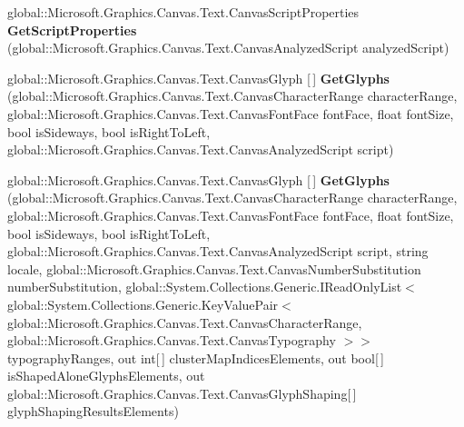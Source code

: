\begin{DoxyCompactItemize}
\mbox{\label{interface_microsoft_1_1_graphics_1_1_canvas_1_1_text_1_1_i_canvas_text_analyzer_a689cfaece7845a1ac47afa71449b2076}} 
global\+::\+Microsoft.\+Graphics.\+Canvas.\+Text.\+Canvas\+Script\+Properties {\bfseries Get\+Script\+Properties} (global\+::\+Microsoft.\+Graphics.\+Canvas.\+Text.\+Canvas\+Analyzed\+Script analyzed\+Script)
\item 
\mbox{\label{interface_microsoft_1_1_graphics_1_1_canvas_1_1_text_1_1_i_canvas_text_analyzer_ae275ea97283c83f61364e0b52c92e782}} 
global\+::\+Microsoft.\+Graphics.\+Canvas.\+Text.\+Canvas\+Glyph \mbox{[}$\,$\mbox{]} {\bfseries Get\+Glyphs} (global\+::\+Microsoft.\+Graphics.\+Canvas.\+Text.\+Canvas\+Character\+Range character\+Range, global\+::\+Microsoft.\+Graphics.\+Canvas.\+Text.\+Canvas\+Font\+Face font\+Face, float font\+Size, bool is\+Sideways, bool is\+Right\+To\+Left, global\+::\+Microsoft.\+Graphics.\+Canvas.\+Text.\+Canvas\+Analyzed\+Script script)
\item 
\mbox{\label{interface_microsoft_1_1_graphics_1_1_canvas_1_1_text_1_1_i_canvas_text_analyzer_a198843bd363ffbb2a16d85d6439972ce}} 
global\+::\+Microsoft.\+Graphics.\+Canvas.\+Text.\+Canvas\+Glyph \mbox{[}$\,$\mbox{]} {\bfseries Get\+Glyphs} (global\+::\+Microsoft.\+Graphics.\+Canvas.\+Text.\+Canvas\+Character\+Range character\+Range, global\+::\+Microsoft.\+Graphics.\+Canvas.\+Text.\+Canvas\+Font\+Face font\+Face, float font\+Size, bool is\+Sideways, bool is\+Right\+To\+Left, global\+::\+Microsoft.\+Graphics.\+Canvas.\+Text.\+Canvas\+Analyzed\+Script script, string locale, global\+::\+Microsoft.\+Graphics.\+Canvas.\+Text.\+Canvas\+Number\+Substitution number\+Substitution, global\+::\+System.\+Collections.\+Generic.\+I\+Read\+Only\+List$<$ global\+::\+System.\+Collections.\+Generic.\+Key\+Value\+Pair$<$ global\+::\+Microsoft.\+Graphics.\+Canvas.\+Text.\+Canvas\+Character\+Range, global\+::\+Microsoft.\+Graphics.\+Canvas.\+Text.\+Canvas\+Typography $>$$>$ typography\+Ranges, out int\mbox{[}$\,$\mbox{]} cluster\+Map\+Indices\+Elements, out bool\mbox{[}$\,$\mbox{]} is\+Shaped\+Alone\+Glyphs\+Elements, out global\+::\+Microsoft.\+Graphics.\+Canvas.\+Text.\+Canvas\+Glyph\+Shaping\mbox{[}$\,$\mbox{]} glyph\+Shaping\+Results\+Elements)
$$
\end{DoxyCompactItemize}
